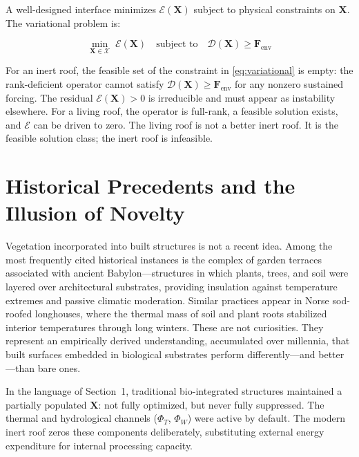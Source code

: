 \documentclass[12pt, a4paper]{article}
\theoremstyle{plain}
\theoremstyle{remark}
\begin{document}
\noindent A well-designed interface minimizes $\mathcal{E}(\mathbf{X})$ subject to physical constraints on $\mathbf{X}$. The variational problem is:

\begin{equation}
  \min_{\mathbf{X} \in \mathcal{X}} \;\mathcal{E}(\mathbf{X})
  \quad \text{subject to} \quad
  \mathcal{D}(\mathbf{X}) \geq \mathbf{F}_{\text{env}}
  \label{eq:variational}
\end{equation}

\noindent For an inert roof, the feasible set of the constraint in \eqref{eq:variational} is empty: the rank-deficient operator cannot satisfy $\mathcal{D}(\mathbf{X}) \geq \mathbf{F}_{\text{env}}$ for any nonzero sustained forcing. The residual $\mathcal{E}(\mathbf{X}) > 0$ is irreducible and must appear as instability elsewhere. For a living roof, the operator is full-rank, a feasible solution exists, and $\mathcal{E}$ can be driven to zero. The living roof is not a better inert roof. It is the feasible solution class; the inert roof is infeasible.

\section{Historical Precedents and the Illusion of Novelty}

Vegetation incorporated into built structures is not a recent idea. Among the most frequently cited historical instances is the complex of garden terraces associated with ancient Babylon---structures in which plants, trees, and soil were layered over architectural substrates, providing insulation against temperature extremes and passive climatic moderation. Similar practices appear in Norse sod-roofed longhouses, where the thermal mass of soil and plant roots stabilized interior temperatures through long winters. These are not curiosities. They represent an empirically derived understanding, accumulated over millennia, that built surfaces embedded in biological substrates perform differently---and better---than bare ones.

In the language of Section~1, traditional bio-integrated structures maintained a partially populated $\mathbf{X}$: not fully optimized, but never fully suppressed. The thermal and hydrological channels ($\Phi_T$, $\Phi_W$) were active by default. The modern inert roof zeros these components deliberately, substituting external energy expenditure for internal processing capacity.
\end{document}
